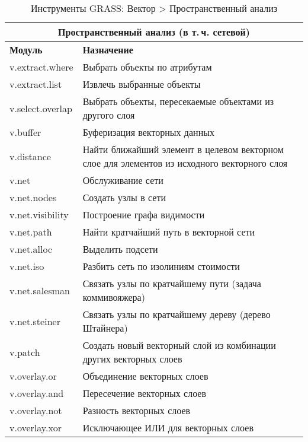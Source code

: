 {\renewcommand{\arraystretch}{0.7}
\begin{table}[H]
\centering
 \begin{tabular}{|p{4cm}|p{11cm}|}
  \hline \multicolumn{2}{|c|}{\textbf{Пространственный анализ (в т.\,ч. сетевой)}} \\
  \hline \textbf{Модуль} & \textbf{Назначение} \\
  \hline v.extract.where & Выбрать объекты по атрибутам \\
  \hline v.extract.list & Извлечь выбранные объекты \\
  \hline v.select.overlap & Выбрать объекты, пересекаемые объектами из
  другого слоя \\
  \hline v.buffer & Буферизация векторных данных \\
  \hline v.distance & Найти ближайший элемент в целевом векторном слое
  для элементов из исходного векторного слоя \\
  \hline v.net & Обслуживание сети \\
  \hline v.net.nodes & Создать узлы в сети \\
  \hline v.net.visibility & Построение графа видимости \\
  \hline v.net.path & Найти кратчайший путь в векторной сети \\
  \hline v.net.alloc & Выделить подсети \\
  \hline v.net.iso & Разбить сеть по изолиниям стоимости \\
  \hline v.net.salesman & Связать узлы по кратчайшему пути (задача коммивояжера) \\
  \hline v.net.steiner & Связать узлы по кратчайшему дереву (дерево Штайнера) \\
  \hline v.patch & Создать новый векторный слой из комбинации других
  векторных слоев \\
  \hline v.overlay.or & Объединение векторных слоев \\
  \hline v.overlay.and & Пересечение векторных слоев \\
  \hline v.overlay.not & Разность векторных слоев \\
  \hline v.overlay.xor & Исключающее ИЛИ для векторных слоев \\
\hline
\end{tabular}
\caption{Инструменты GRASS: Вектор > Пространственный анализ}
\end{table}}

